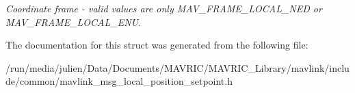 \begin{DoxyCompactItemize}
\begin{DoxyCompactList}\small\item\em Coordinate frame -\/ valid values are only M\+A\+V\+\_\+\+F\+R\+A\+M\+E\+\_\+\+L\+O\+C\+A\+L\+\_\+\+N\+E\+D or M\+A\+V\+\_\+\+F\+R\+A\+M\+E\+\_\+\+L\+O\+C\+A\+L\+\_\+\+E\+N\+U. \end{DoxyCompactList}\end{DoxyCompactItemize}


The documentation for this struct was generated from the following file\+:\begin{DoxyCompactItemize}
\item 
/run/media/julien/\+Data/\+Documents/\+M\+A\+V\+R\+I\+C/\+M\+A\+V\+R\+I\+C\+\_\+\+Library/mavlink/include/common/mavlink\+\_\+msg\+\_\+local\+\_\+position\+\_\+setpoint.\+h\end{DoxyCompactItemize}
